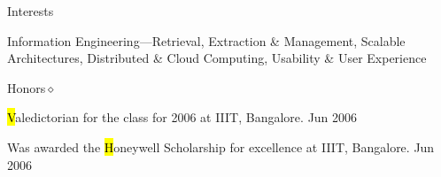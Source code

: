 \documentclass{resume}
\begin{document}
\begin{category}{Interests}{}

    \item Information Engineering---Retrieval, Extraction \&
    Management, Scalable Architectures, Distributed \& Cloud Computing,
    Usability \& User Experience

\end{category}


\begin{category}{Honors}{$\diamond$}

    \item {\hl Valedictorian} for the class for 2006 at IIIT, Bangalore.
    {\period Jun 2006}

    \item Was awarded the {\hl Honeywell Scholarship} for excellence at IIIT,
    Bangalore.
    {\period Jun 2006}

\end{category}
\end{document}
